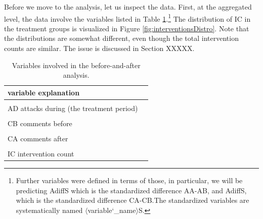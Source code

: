 \documentclass[preprint,12pt]{elsarticle}
\begin{document}
Before we move to the analysis, let us inspect the data. First, at the
aggregated level, the data involve the variables listed in Table
\ref{tab:baaVars}.\footnote{Further variables were defined in terms of those, in particular, we will be predicting \textsf{AdiffS} which is the standardized difference  \textsf{AA}-\textsf{AB}, and \textsf{AdiffS}, which is the standardized difference \textsf{CA}-\textsf{CB}.The  standardized variables are systematically named  $\langle$variable\char`_name$\rangle$S.} The distribution of \textsf{IC} in the treatment groups is visualized in
Figure \ref{fig:interventionsDistro}. Note that the distributions are
somewhat different, even though the total intervention counts are
similar. The issue is discussed in Section XXXXX.


\vspace{1mm}
\footnotesize

\normalsize

\begin{table}
\centering
\begin{tabular}{ll}
\toprule
variable  explanation\\
\midrule
\cellcolor{gray!6}{AB}  \cellcolor{gray!6}{attacks before (pre-treatment)}\\
AD  attacks during (the treatment period)\\
\cellcolor{gray!6}{AA}  \cellcolor{gray!6}{attacks after (post-treatment)}\\
CB  comments before\\
\cellcolor{gray!6}{CD}  \cellcolor{gray!6}{comments during}\\
CA  comments after\\
\cellcolor{gray!6}{group}  \cellcolor{gray!6}{treatment group}\\
IC  intervention count\\
\bottomrule
\end{tabular}

\caption{Variables involved in the before-and-after analysis.}
\label{tab:baaVars}
\end{table}
\end{document}

